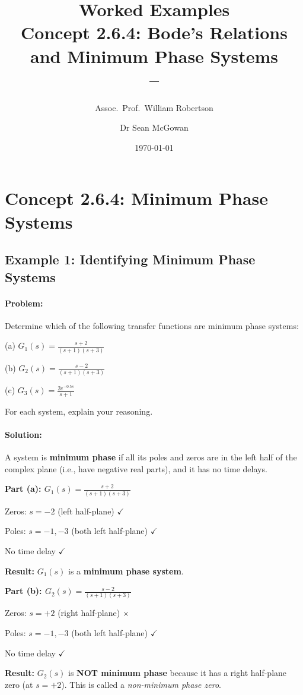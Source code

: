 \documentclass[11pt,a4paper]{article}
\title{\textbf{Worked Examples}\\[0.5em]
\large Concept 2.6.4: Bode's Relations and Minimum Phase Systems\\[0.3em]
\normalsize \coursesubtitle{} -- \coursetitle}
\author{Assoc.\ Prof.\ William Robertson \and Dr Sean McGowan}
\date{\today}
\begin{document}
\maketitle
\tableofcontents
\newpage

\section{Concept 2.6.4: Minimum Phase Systems}

\subsection{Example 1: Identifying Minimum Phase Systems}

\paragraph{Problem:} Determine which of the following transfer functions are minimum phase systems:

(a) $G_1(s) = \frac{s+2}{(s+1)(s+3)}$

(b) $G_2(s) = \frac{s-2}{(s+1)(s+3)}$

(c) $G_3(s) = \frac{2e^{-0.5s}}{s+1}$

For each system, explain your reasoning.

\paragraph{Solution:}

A system is \textbf{minimum phase} if all its poles and zeros are in the left half of the complex plane (i.e., have negative real parts), and it has no time delays.

\textbf{Part (a): $G_1(s) = \frac{s+2}{(s+1)(s+3)}$}

Zeros: $s = -2$ (left half-plane) $\checkmark$

Poles: $s = -1, -3$ (both left half-plane) $\checkmark$

No time delay $\checkmark$

\textbf{Result:} $G_1(s)$ is a \textbf{minimum phase system}.

\textbf{Part (b): $G_2(s) = \frac{s-2}{(s+1)(s+3)}$}

Zeros: $s = +2$ (right half-plane) $\times$

Poles: $s = -1, -3$ (both left half-plane) $\checkmark$

No time delay $\checkmark$

\textbf{Result:} $G_2(s)$ is \textbf{NOT minimum phase} because it has a right half-plane zero (at $s = +2$). This is called a \textit{non-minimum phase zero}.
\end{document}
